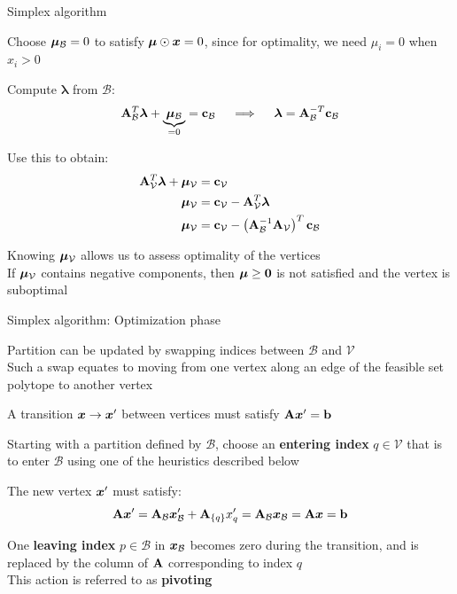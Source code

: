 \documentclass[11pt,compress,t,notes=noshow, xcolor=table]{beamer}
\begin{document}
\begin{framei}[fs=small]{Simplex algorithm}
\item Choose $ \bm{\mu}_{\mathcal{B}} = 0 $ to satisfy $\bm{\mu} \odot \bm{x} = 0$, since for optimality, we need $\mu_i=0$ when $x_i > 0$
\item Compute $ \bm{\lambda} $ from $ \mathcal{B} $:
$$
\mathbf{A}_{\mathcal{B}}^T \bm{\lambda} + \underbrace{\bm{\mu}_{\mathcal{B}}}_{= 0} = \mathbf{c}_{\mathcal{B}} \quad \implies \quad \bm{\lambda} = \mathbf{A}_{\mathcal{B}}^{-T} \mathbf{c}_{\mathcal{B}}
$$
\item Use this to obtain:
\begin{align*}
\mathbf{A}_{\mathcal{V}}^T \bm{\lambda} + \bm{\mu}_{\mathcal{V}} &= \mathbf{c}_{\mathcal{V}}\\
\bm{\mu}_{\mathcal{V}} &= \mathbf{c}_{\mathcal{V}} - \mathbf{A}_{\mathcal{V}}^T \bm{\lambda}\\
\bm{\mu}_{\mathcal{V}} &= \mathbf{c}_{\mathcal{V}} - \left( \mathbf{A}_{\mathcal{B}}^{-1} \mathbf{A}_{\mathcal{V}} \right)^T \mathbf{c}_{\mathcal{B}}
\end{align*}
\item Knowing $ \bm{\mu}_{\mathcal{V}} $ allows us to assess optimality of the vertices\\
If $ \bm{\mu}_{\mathcal{V}} $ contains negative components, then $\bm{\mu} \ge \mathbf{0}$ is not satisfied and the vertex is suboptimal
\end{framei}


\begin{framei}[fs=small]{Simplex algorithm: Optimization phase}
\item Partition can be updated by swapping indices between $\mathcal{B}$ and $\mathcal{V}$\\
Such a swap equates to moving from one vertex along an edge of the feasible set polytope to another vertex
\item A transition $ \bm{x} \to \bm{x}' $ between vertices must satisfy $ \mathbf{A} \bm{x}' = \mathbf{b} $
\item Starting with a partition defined by $ \mathcal{B} $, choose an \textbf{entering index} $ q \in \mathcal{V} $ that is to enter $ \mathcal{B} $ using one of the heuristics described below
\item The new vertex $ \bm{x}' $ must satisfy:
$$
\mathbf{A} \bm{x}' = \mathbf{A}_{\mathcal{B}} \bm{x}'_{\mathcal{B}} + \mathbf{A}_{\{q\}} x'_q = \mathbf{A}_{\mathcal{B}} \bm{x}_{\mathcal{B}} = \mathbf{A} \bm{x} = \mathbf{b}
$$
\item One \textbf{leaving index} $ p \in \mathcal{B} $ in $ \bm{x}_{\mathcal{B}} $ becomes zero during the transition, and is replaced by the column of $ \mathbf{A} $ corresponding to index $ q $\\
This action is referred to as \textbf{pivoting}
\end{framei}
\end{document}
